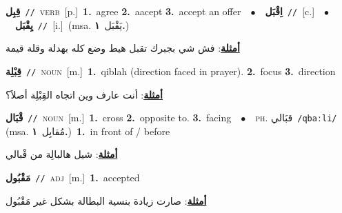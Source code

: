 \documentclass[10pt,a4paper,twoside]{article} %
\begin{document}
\begin{multicols}{2}
{\setlength\topsep{0pt}\textbf{\foreignlanguage{arabic}{قِبِل}}\ {\color{gray}\texttt{//}\color{black}}\ \textsc{verb}\ [p.]\ \textbf{1.}~agree  \textbf{2.}~aacept  \textbf{3.}~accept an offer\ \ $\bullet$\ \ \setlength\topsep{0pt}\textbf{\foreignlanguage{arabic}{اِقْبَل}}\ {\color{gray}\texttt{//}\color{black}}\ [c.]\ \ $\bullet$\ \ \setlength\topsep{0pt}\textbf{\foreignlanguage{arabic}{يِقْبَل}}\ {\color{gray}\texttt{//}\color{black}}\ [i.]\ \color{gray}(msa. \foreignlanguage{arabic}{يَقْبَل}~\foreignlanguage{arabic}{\textbf{١.}})\color{black}\  \begin{flushright}\color{gray}\foreignlanguage{arabic}{\textbf{\underline{\foreignlanguage{arabic}{أمثلة}}}: فش شي بجبرك تقبل هيط وضع كله بهدلة وقلة قيمة}\end{flushright}\color{black}} \vspace{2mm}

{\setlength\topsep{0pt}\textbf{\foreignlanguage{arabic}{قِبْلِة}}\ {\color{gray}\texttt{//}\color{black}}\ \textsc{noun}\ [m.]\ \textbf{1.}~qiblah (direction faced in prayer).  \textbf{2.}~focus  \textbf{3.}~direction\  \begin{flushright}\color{gray}\foreignlanguage{arabic}{\textbf{\underline{\foreignlanguage{arabic}{أمثلة}}}: أنت عارف وين اتجاه القِبْلِة أصلاََ؟}\end{flushright}\color{black}} \vspace{2mm}

{\setlength\topsep{0pt}\textbf{\foreignlanguage{arabic}{قْبَال}}\ {\color{gray}\texttt{//}\color{black}}\ \textsc{noun}\ [m.]\ \textbf{1.}~cross  \textbf{2.}~opposite to.  \textbf{3.}~facing\ \ $\bullet$\ \ \textsc{ph.} \color{gray} \foreignlanguage{arabic}{قبَالي}\color{black}\ {\color{gray}\texttt{/{\sffamily qbaːli}/}\color{black}}\ \color{gray} (msa. \foreignlanguage{arabic}{مُقابِل}~\foreignlanguage{arabic}{\textbf{١.}})\color{black}\ \textbf{1.}~in front of / before\  \begin{flushright}\color{gray}\foreignlanguage{arabic}{\textbf{\underline{\foreignlanguage{arabic}{أمثلة}}}: شيل هالبالِة من قْبالي}\end{flushright}\color{black}} \vspace{2mm}

{\setlength\topsep{0pt}\textbf{\foreignlanguage{arabic}{مَقْبُول}}\ {\color{gray}\texttt{//}\color{black}}\ \textsc{adj}\ [m.]\ \textbf{1.}~accepted\  \begin{flushright}\color{gray}\foreignlanguage{arabic}{\textbf{\underline{\foreignlanguage{arabic}{أمثلة}}}: صارت زيادة بنسية البطالة بشكل غير مَقْبُول}\end{flushright}\color{black}} \vspace{2mm}


\end{multicols}
\end{document}
